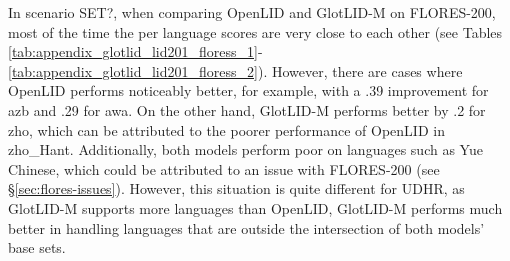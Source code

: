 \documentclass[11pt]{article}
\newcommand{\basequ}{SET?\xspace}
\def\modelname{\mbox{GlotLID-M}\xspace}
\def\flores{FLORES\xspace}
\def\udhr{UDHR\xspace}
\def\edin{OpenLID\xspace}
\def\secref#1{\S\ref{sec:#1}}
\begin{document}
In scenario \basequ, when comparing \edin and \modelname on \flores-200, most of the time the per language scores are very close to each other (see Tables \ref{tab:appendix_glotlid_lid201_floress_1}- \ref{tab:appendix_glotlid_lid201_floress_2}). However, there are cases where \edin performs noticeably better, for example, with a .39 improvement for azb and .29 for awa. On the other hand, \modelname performs better by .2 for zho, which can be attributed to the poorer performance of \edin in zho\_Hant. Additionally, both models perform poor on languages such as Yue Chinese, which could be attributed to an issue with \flores-200 (see \secref{flores-issues}). However, this situation is quite different for \udhr, as \modelname supports more languages than \edin, \modelname performs much better in handling languages that are outside the intersection of both models' base sets.
\end{document}
